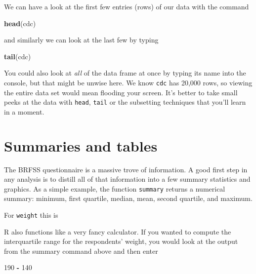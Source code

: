 \documentclass[]{book}
\newenvironment{Shaded}{\begin{snugshade}}{\end{snugshade}}
\newcommand{\KeywordTok}[1]{\textcolor[rgb]{0.13,0.29,0.53}{\textbf{#1}}}
\newcommand{\DecValTok}[1]{\textcolor[rgb]{0.00,0.00,0.81}{#1}}
\newcommand{\StringTok}[1]{\textcolor[rgb]{0.31,0.60,0.02}{#1}}
\newcommand{\OperatorTok}[1]{\textcolor[rgb]{0.81,0.36,0.00}{\textbf{#1}}}
\newcommand{\NormalTok}[1]{#1}
\theoremstyle{definition}
\theoremstyle{definition}
\theoremstyle{definition}
\theoremstyle{remark}
\begin{document}
We can have a look at the first few entries (rows) of our data with the
command

\begin{Shaded}
\begin{Highlighting}[]
\KeywordTok{head}\NormalTok{(cdc)}
\end{Highlighting}
\end{Shaded}

and similarly we can look at the last few by typing

\begin{Shaded}
\begin{Highlighting}[]
\KeywordTok{tail}\NormalTok{(cdc)}
\end{Highlighting}
\end{Shaded}

You could also look at \emph{all} of the data frame at once by typing
its name into the console, but that might be unwise here. We know
\texttt{cdc} has 20,000 rows, so viewing the entire data set would mean
flooding your screen. It's better to take small peeks at the data with
\texttt{head}, \texttt{tail} or the subsetting techniques that you'll
learn in a moment.

\section{Summaries and tables}\label{summaries-and-tables}

The BRFSS questionnaire is a massive trove of information. A good first
step in any analysis is to distill all of that information into a few
summary statistics and graphics. As a simple example, the function
\texttt{summary} returns a numerical summary: minimum, first quartile,
median, mean, second quartile, and maximum.

For \texttt{weight} this is

\begin{Shaded}
\end{Shaded}

R also functions like a very fancy calculator. If you wanted to compute
the interquartile range for the respondents' weight, you would look at
the output from the summary command above and then enter

\begin{Shaded}
\begin{Highlighting}[]
\DecValTok{190} \OperatorTok{-}\StringTok{ }\DecValTok{140}
\end{Highlighting}
\end{Shaded}
\end{document}
